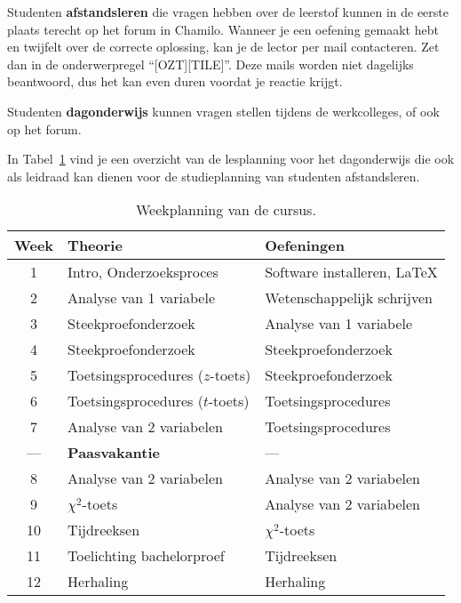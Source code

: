 Studenten \textbf{afstandsleren} die vragen hebben over de leerstof kunnen in de eerste plaats terecht op het forum in Chamilo. Wanneer je een oefening gemaakt hebt en twijfelt over de correcte oplossing, kan je de lector per mail contacteren. Zet dan in de onderwerpregel ``[OZT][TILE]''. Deze mails worden niet dagelijks beantwoord, dus het kan even duren voordat je reactie krijgt.

Studenten \textbf{dagonderwijs} kunnen vragen stellen tijdens de werkcolleges, of ook op het forum.

In Tabel~\ref{tab:weekplanning} vind je een overzicht van de lesplanning voor het dagonderwijs die ook als leidraad kan dienen voor de studieplanning van studenten afstandsleren.

\begin{table}
  \begin{center}
    \begin{tabular}{cll}
       \hline
       \textbf{Week} & \textbf{Theorie}     & \textbf{Oefeningen}            \\
       \hline
       1  & Intro, Onderzoeksproces         & Software installeren, \LaTeX{} \\
       2  & Analyse van 1 variabele         & Wetenschappelijk schrijven     \\
       3  & Steekproefonderzoek             & Analyse van 1 variabele        \\
       4  & Steekproefonderzoek             & Steekproefonderzoek            \\
       5  & Toetsingsprocedures ($z$-toets) & Steekproefonderzoek            \\
       6  & Toetsingsprocedures ($t$-toets) & Toetsingsprocedures            \\
       7  & Analyse van 2 variabelen        & Toetsingsprocedures            \\
      --- & \textbf{Paasvakantie}           & ---                            \\
       8  & Analyse van 2 variabelen        & Analyse van 2 variabelen       \\
       9  & $\chi^2$-toets                  & Analyse van 2 variabelen       \\
      10  & Tijdreeksen                     & $\chi^2$-toets                 \\
      11  & Toelichting bachelorproef       & Tijdreeksen                    \\
      12  & Herhaling                       & Herhaling                      \\
      \hline
    \end{tabular}
    \caption[Weekplanning]{Weekplanning van de cursus.}
    \label{tab:weekplanning}
  \end{center}
\end{table}

